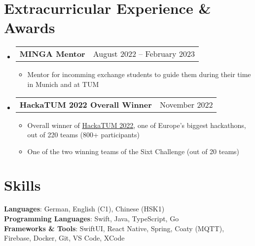 \documentclass[letterpaper,11pt]{article}
\makeatletter
\newcommand{\resumeItem}[1]{
  \item\small{
    {#1 \vspace{-2pt}}
  }
}
\newcommand{\resumeProjectHeading}[2]{
    \item
    \begin{tabular*}{0.97\textwidth}{l@{\extracolsep{\fill}}r}
      \small#1 & #2 \\
    \end{tabular*}\vspace{-7pt}
}
\newcommand{\resumeSubHeadingListStart}{\begin{itemize}[leftmargin=0.15in, label={}]}
\newcommand{\resumeSubHeadingListEnd}{\end{itemize}}
\newcommand{\resumeItemListStart}{\begin{itemize}}
\newcommand{\resumeItemListEnd}{\end{itemize}\vspace{-5pt}}
\makeatother
\begin{document}
\section{Extracurricular Experience \& Awards}
\resumeSubHeadingListStart
  \resumeProjectHeading
    {\textbf{MINGA Mentor} }{August 2022 -- February 2023}
    \resumeItemListStart
      \resumeItem{Mentor for incomming exchange students to guide them during their time in Munich and at TUM}
    \resumeItemListEnd
  \resumeProjectHeading
    {\textbf{HackaTUM 2022 Overall Winner}}{November 2022}
    \resumeItemListStart
      \resumeItem{Overall winner of \href{https://devpost.com/software/sixtcharge}{HackaTUM 2022}, one of Europe's biggest hackathons, out of 220 teams (800+ participants)}
      \resumeItem{One of the two winning teams of the Sixt Challenge (out of 20 teams)}
  \resumeItemListEnd
\resumeSubHeadingListEnd

\section{Skills}
 \begin{itemize}[leftmargin=0.15in, label={}]
    \small{\item{
     \textbf{Languages}{: German, English (C1), Chinese (HSK1)} \\
     \textbf{Programming Languages}{: Swift, Java, TypeScript, Go} \\
     \textbf{Frameworks \& Tools}{: SwiftUI, React Native, Spring, Coaty (MQTT), Firebase, Docker, Git, VS Code, XCode } \\
    }}
 \end{itemize}

\end{document}
